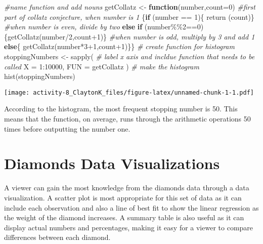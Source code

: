 \documentclass[
]{article}
\newenvironment{Shaded}{\begin{snugshade}}{\end{snugshade}}
\newcommand{\AttributeTok}[1]{\textcolor[rgb]{0.77,0.63,0.00}{#1}}
\newcommand{\CommentTok}[1]{\textcolor[rgb]{0.56,0.35,0.01}{\textit{#1}}}
\newcommand{\ControlFlowTok}[1]{\textcolor[rgb]{0.13,0.29,0.53}{\textbf{#1}}}
\newcommand{\DecValTok}[1]{\textcolor[rgb]{0.00,0.00,0.81}{#1}}
\newcommand{\FunctionTok}[1]{\textcolor[rgb]{0.00,0.00,0.00}{#1}}
\newcommand{\NormalTok}[1]{#1}
\newcommand{\OtherTok}[1]{\textcolor[rgb]{0.56,0.35,0.01}{#1}}
\newcommand{\SpecialCharTok}[1]{\textcolor[rgb]{0.00,0.00,0.00}{#1}}
\begin{document}
\begin{Shaded}
\begin{Highlighting}[]
\CommentTok{\#name function and add nouns}
\NormalTok{getCollatz }\OtherTok{\textless{}{-}} \ControlFlowTok{function}\NormalTok{(number,}\AttributeTok{count=}\DecValTok{0}\NormalTok{)}
  \CommentTok{\#first part of collatz conjecture, when number is 1}
\NormalTok{\{}\ControlFlowTok{if}\NormalTok{ (number }\SpecialCharTok{==} \DecValTok{1}\NormalTok{)\{}
  \FunctionTok{return}\NormalTok{ (count)\}}
  \CommentTok{\#when number is even, divide by two}
  \ControlFlowTok{else} \ControlFlowTok{if}\NormalTok{ (number}\SpecialCharTok{\%\%}\DecValTok{2}\SpecialCharTok{==}\DecValTok{0}\NormalTok{)}
\NormalTok{    \{}\FunctionTok{getCollatz}\NormalTok{(number}\SpecialCharTok{/}\DecValTok{2}\NormalTok{,count}\SpecialCharTok{+}\DecValTok{1}\NormalTok{)\}}
  \CommentTok{\#when number is odd, multiply by 3 and add 1}
  \ControlFlowTok{else}\NormalTok{\{}
    \FunctionTok{getCollatz}\NormalTok{(number}\SpecialCharTok{*}\DecValTok{3}\SpecialCharTok{+}\DecValTok{1}\NormalTok{,count}\SpecialCharTok{+}\DecValTok{1}\NormalTok{)\}\}}
\CommentTok{\# create function for histogram}
\NormalTok{stoppingNumbers }\OtherTok{\textless{}{-}} \FunctionTok{sapply}\NormalTok{(}
\CommentTok{\# label x axis and incldue function that needs to be called}
\AttributeTok{X =} \DecValTok{1}\SpecialCharTok{:}\DecValTok{10000}\NormalTok{,}
\AttributeTok{FUN =}\NormalTok{ getCollatz}
\NormalTok{)}
\CommentTok{\# make the histogram}
\FunctionTok{hist}\NormalTok{(stoppingNumbers)}
\end{Highlighting}
\end{Shaded}

\texttt{[image: activity-8\_ClaytonK\_files/figure-latex/unnamed-chunk-1-1.pdf]}

According to the histogram, the most frequent stopping number is 50.
This means that the function, on average, runs through the arithmetic
operations 50 times before outputting the number one.

\hypertarget{diamonds-data-visualizations}{%
\section{Diamonds Data
Visualizations}\label{diamonds-data-visualizations}}

A viewer can gain the most knowledge from the diamonds data through a
data visualization. A scatter plot is most appropriate for this set of
data as it can include each observation and also a line of best fit to
show the linear regression as the weight of the diamond increases. A
summary table is also useful as it can display actual numbers and
percentages, making it easy for a viewer to compare differences between
each diamond.
\end{document}

